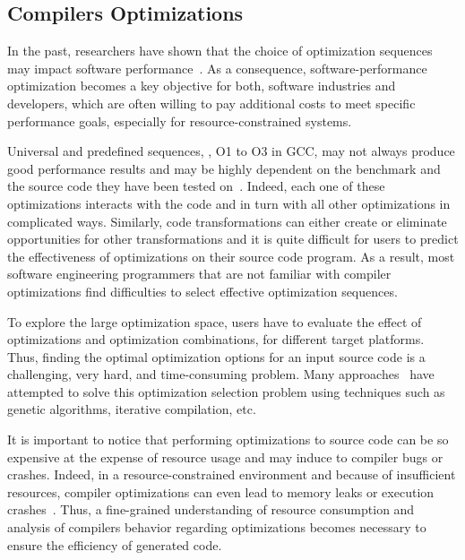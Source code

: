  
\iffalse 
\subsection{Compilers Optimizations}
In the past, researchers have shown that the choice of optimization sequences may impact software performance~\cite{almagor2004finding,chen2012deconstructing}. 
As a consequence, software-performance optimization becomes a key objective for both, software industries and developers, which are often willing to pay additional costs to meet specific performance goals, especially for resource-constrained systems.

Universal and predefined sequences, \eg, O1 to O3 in GCC, may not always produce good performance results and may be highly dependent on the benchmark and the source code they have been tested on~\cite{almagor2004finding,hoste2008cole}.
Indeed, each one of these optimizations interacts with the code and in turn with all other optimizations in complicated ways. Similarly, code transformations can either create or eliminate opportunities for other transformations and it is quite difficult for users to predict the effectiveness of optimizations on their source code program.
As a result, most software engineering programmers that are not familiar with compiler optimizations find difficulties to select effective optimization sequences.

To explore the large optimization space, users have to evaluate the effect of optimizations and optimization combinations, for different target platforms. 
Thus, finding the optimal optimization options for an input source code is a challenging, very hard, and time-consuming problem. 
Many approaches~\cite{hoste2008cole,zhong2009tuning,sandran2012genetic,martins2014exploration} have attempted to solve this optimization selection problem using techniques such as genetic algorithms, iterative compilation, etc.

It is important to notice that performing optimizations to source code can be so expensive at the expense of resource usage and may induce to compiler bugs or crashes. 
Indeed, in a resource-constrained environment and because of insufficient resources, compiler optimizations can even lead to memory leaks or execution crashes~\cite{yang2011finding}. 
Thus, a fine-grained understanding of resource consumption and analysis of compilers behavior regarding optimizations becomes necessary to ensure the efficiency of generated code.

